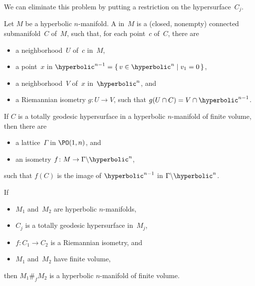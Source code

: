 We can eliminate this problem by putting a restriction on
the hypersurface~$C_j$.

\begin{defn}
Let $M$ be a hyperbolic $n$-manifold. 
 A  in~$M$ is a (closed, nonempty) connected
submanifold~$C$ of~$M$, such that, for each point~$c$
of~$C$, there are
 \begin{itemize}
 \item a neighborhood~$U$ of~$c$ in~$M$,
 \item a point~$x$ in $\hyperbolic^{n-1} = \{\, v \in
\hyperbolic^n \mid v_1 = 0 \,\}$,
 \item a neighborhood~$V$ of~$x$ in~$\hyperbolic^n$, and
 \item a Riemannian isometry $g \colon U \to V$, such that
$g(U \cap C) = V \cap \hyperbolic^{n-1}$.
 \end{itemize}
 \end{defn}

\begin{rem} \label{totgeod=Hn-1}
 If $C$ is a totally geodesic hypersurface in a hyperbolic
$n$-manifold of finite volume, then there are
 \begin{itemize}
 \item a lattice~$\Gamma$ in $\PO(1,n)$, and
 \item an isometry $f \colon M \to \Gamma \backslash
\hyperbolic^n$,
 \end{itemize}
 such that $f(C)$ is the image of $\hyperbolic^{n-1}$ in
$\Gamma \backslash \hyperbolic^n$.
 \end{rem}

\begin{prop} \label{M1cupM2hyper}
 If
 \begin{itemize}
 \item $M_1$ and~$M_2$ are hyperbolic $n$-manifolds,
 \item $C_j$ is a totally geodesic hypersurface in~$M_j$,
 \item $f \colon C_1 \to C_2$ is a Riemannian isometry, 
 and
 \item $M_1$ and~$M_2$ have finite volume,
 \end{itemize}
 then $M_1 \#_f M_2$ is a hyperbolic $n$-manifold of finite
volume.
 \end{prop}

